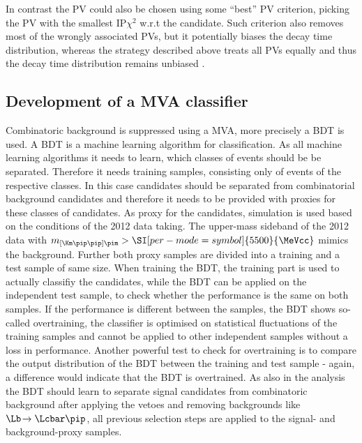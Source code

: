 In contrast the \ac{PV} could also be chosen using some \enquote{best} \ac{PV} criterion, \eg picking the \ac{PV} with the smallest $\text{IP}\chi^2$ w.r.t the \Bz candidate.
Such criterion also removes most of the wrongly associated \ac{PV}s, but it potentially biases the decay time distribution, whereas the strategy described above treats all \ac{PV}s equally and thus the decay time distribution remains unbiased .

\subsection{Development of a MVA classifier}
\label{sec:MVADev}

Combinatoric background is suppressed using a \ac{MVA}, more precisely a \ac{BDT} is used.
A \ac{BDT} is a machine learning algorithm for classification.
As all machine learning algorithms it needs to learn, which classes of events should be be separated.
Therefore it needs training samples, consisting only of events of the respective classes.
In this case \BdToDpi candidates should be separated from combinatorial background candidates and therefore it needs to be provided with proxies for these classes of candidates.
As proxy for the \BdToDpi candidates, simulation is used based on the conditions of the \num{2012} data taking.
The upper-mass sideband of the \num{2012} data with $m_{\left[\Km\pip\pip\right]\pim}>\SI[per-mode=symbol]{5500}{\MeVcc}$ mimics the background.
Further both proxy samples are divided into a training and a test sample of same size.
When training the \ac{BDT}, the training part is used to actually classifiy the candidates, while the \ac{BDT} can be applied on the independent test sample, to check whether the performance is the same on both samples.
If the performance is different between the samples, the \ac{BDT} shows so-called overtraining, \ie the classifier is optimised on statistical fluctuations of the training samples and cannot be applied to other independent samples without a loss in performance.
Another powerful test to check for overtraining is to compare the output distribution of the \ac{BDT} between the training and test sample - again, a difference would indicate that the \ac{BDT} is overtrained.
As also in the analysis the \ac{BDT} should learn to separate signal candidates from combinatoric background after applying the vetoes and removing backgrounds like $\Lb\!\to\Lcbar\pip$, all previous selection steps are applied to the signal- and background-proxy samples.

